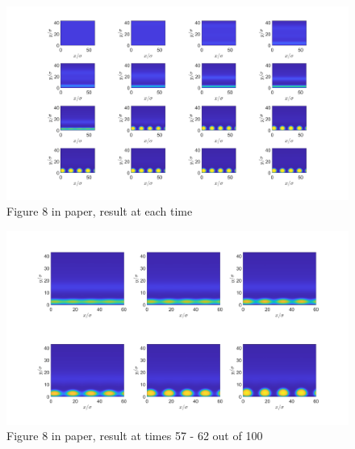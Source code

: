 \documentclass[11pt, a4paper]{article}
\theoremstyle{definition}
\begin{document}
	\begin{figure}[h]
		\centering
		\includegraphics[scale=0.25]{Plotrhobar0072.png}
		\caption{Figure 8 in paper, result at each time} 
		\label{F5}
	\end{figure}
	\begin{figure}[h]
		\centering
		\includegraphics[scale=0.25]{rhobar0072Zoom57to62.png}
		\caption{Figure 8 in paper, result at times 57 - 62 out of 100} 
		\label{F6}
	\end{figure}
\end{document}
